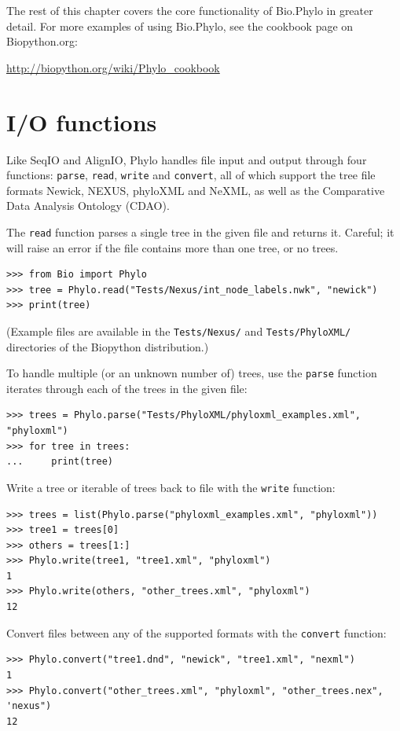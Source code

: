 \documentclass{report}
\begin{document}
The rest of this chapter covers the core functionality of Bio.Phylo in greater detail. For more
examples of using Bio.Phylo, see the cookbook page on Biopython.org:

\url{http://biopython.org/wiki/Phylo_cookbook}

\section{I/O functions}

Like SeqIO and AlignIO, Phylo handles file input and output through four functions:
\verb|parse|, \verb|read|, \verb|write| and \verb|convert|,
all of which support the tree file formats Newick, NEXUS, phyloXML and NeXML, as
well as the Comparative Data Analysis Ontology (CDAO).

The \verb|read| function parses a single tree in the given file and returns it. Careful; it
will raise an error if the file contains more than one tree, or no trees.

\begin{verbatim}
>>> from Bio import Phylo
>>> tree = Phylo.read("Tests/Nexus/int_node_labels.nwk", "newick")
>>> print(tree)
\end{verbatim}

(Example files are available in the \texttt{Tests/Nexus/} and \texttt{Tests/PhyloXML/}
directories of the Biopython distribution.)

To handle multiple (or an unknown number of) trees, use the \verb|parse| function iterates
through each of the trees in the given file: 

\begin{verbatim}
>>> trees = Phylo.parse("Tests/PhyloXML/phyloxml_examples.xml", "phyloxml")
>>> for tree in trees:
...     print(tree)
\end{verbatim}

Write a tree or iterable of trees back to file with the \verb|write| function:

\begin{verbatim}
>>> trees = list(Phylo.parse("phyloxml_examples.xml", "phyloxml"))
>>> tree1 = trees[0]
>>> others = trees[1:]
>>> Phylo.write(tree1, "tree1.xml", "phyloxml")
1
>>> Phylo.write(others, "other_trees.xml", "phyloxml")
12
\end{verbatim}

Convert files between any of the supported formats with the \verb|convert| function:

\begin{verbatim}
>>> Phylo.convert("tree1.dnd", "newick", "tree1.xml", "nexml")
1
>>> Phylo.convert("other_trees.xml", "phyloxml", "other_trees.nex", 'nexus")
12
\end{verbatim}
\end{document}
